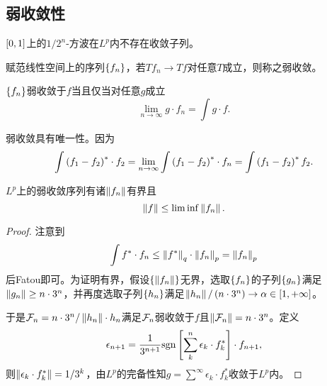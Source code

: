 \documentclass{ctexrep}
\begin{document}
  \subsection{弱收敛性}
  \begin{ex}
    $\left[0,1\right]$上的$1/2^n$-方波在$L^p$内不存在收敛子列。
  \end{ex}
  \begin{definition}
    赋范线性空间上的序列$\left\{f_n\right\}$，若$Tf_n\to Tf$对任意$T$成立，则称之弱收敛。
  \end{definition}
  \begin{proposition}
    $\left\{f_n\right\}$弱收敛于$f$当且仅当对任意$g$成立
    \[ \lim_{n\to\infty} g\cdot f_n = \int g \cdot f. \]
  \end{proposition}
  弱收敛具有唯一性。因为
  \[ \int \left(f_1-f_2\right)^*\cdot f_2 = \lim_{n\to\infty} \int \left(f_1-f_2\right)^*\cdot f_n = \int \left(f_1-f_2\right)^* f_2. \]
  \begin{theorem}
    $L^p$上的弱收敛序列有诸$\left\| f_n \right\|$有界且
    \[ \left\| f \right\| \le \lim \inf \left\| f_n \right\|. \]
  \end{theorem}
  \begin{proof}
    注意到
    \[ \int f^*\cdot f_n \le \left\| f^* \right\|_q \cdot \left\| f_n \right\|_p = \left\| f_n \right\|_p \]
    后Fatou即可。为证明有界，假设$\left\{\left\| f_n \right\|\right\}$无界，选取$\left\{f_n\right\}$的子列$\left\{g_n\right\}$满足$\left\| g_n \right\|\ge n\cdot 3^n$，并再度选取子列$\left\{h_n\right\}$满足$\left\| h_n \right\|/\left(n\cdot 3^n\right)\rightarrow \alpha\in\left[1,+\infty\right]$。
    \par
    于是$\mathcal{F}_n = n\cdot 3^n/\left\| h_n \right\|\cdot h_n$满足$\mathcal{F}_n$弱收敛于$f$且$\left\| \mathcal{F}_n \right\|=n\cdot 3^n$。定义
    \[ \epsilon_{n+1} = \frac{1}{3^{n+1}}\mathrm{sgn} \left[\sum_k^n \epsilon_k \cdot f_k^*\right]\cdot f_{n+1}, \]
    则$\left\| \epsilon_k\cdot f_k^* \right\|=1/3^k$，由$L^p$的完备性知$g=\sum^\infty \epsilon_k \cdot f_k^*$收敛于$L^p$内。
    
  \end{proof}


 
\ifx\allfiles\undefined %
\end{document}
